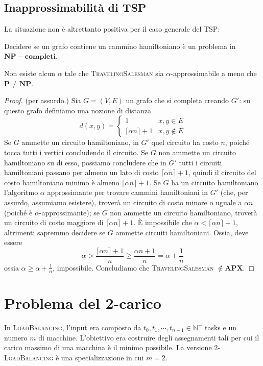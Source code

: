 \subsection{Inapprossimabilità di TSP}
La situazione non è altrettanto positiva per il caso generale del TSP:
\begin{theorem}
	Decidere se un grafo contiene un cammino hamiltoniano è un problema in $\mathbf{NP-completi}$.
\end{theorem}

\begin{theorem}
	Non esiste alcun $\alpha$ tale che \textsc{TravelingSalesman} sia $\alpha$-approssimabile a meno che
	$\mathbf{P} \neq \mathbf{NP}$.
\end{theorem}
\begin{proof}
	(per assurdo.)
	Sia $G = (V,E)$ un grafo che si completa creando $G'$: su questo grafo definiamo
	una nozione di distanza
	$$
		d(x,y) =
		\begin{cases}
			1                         & x, y \in E    \\
			\lceil \alpha n \rceil +1 & x, y \notin E
		\end{cases}
	$$
	Se $G$ ammette un circuito hamiltoniano, in $G'$ quel circuito ha costo
	$n$, poiché tocca tutti i vertici concludendo il circuito. Se $G$ non ammette
	un circuito hamiltoniano su di esso, possiamo concludere che in $G'$ tutti i
	circuiti hamiltoniani passano per almeno un lato di costo $\lceil \alpha n \rceil +1 $,
	quindi il circuito del costo hamiltoniano minimo è almeno $\lceil \alpha n \rceil + 1$.
	Se $G$ ha un circuito hamiltoniano l'algoritmo $\alpha$ approssimante per
	trovare cammini hamiltoniani in $G'$ (che, per assurdo, assumiamo esistere),
	troverà un circuito di costo minore o uguale a $\alpha n$ (poiché è $\alpha$-approssimante);
	se $G$ non ammette un circuito hamiltoniano, troverà un circuito di costo
	maggiore di $\lceil \alpha n \rceil +1$.
	\`E impossibile che $\alpha < \lceil \alpha n \rceil + 1$, altrimenti sapremmo
	decidere se $G$ ammette circuiti hamiltoniani. Ossia, deve essere
	$$
		\alpha > \frac{\lceil \alpha n \rceil + 1}{n} \geq \frac{\alpha n +1}{n} = \alpha + \frac{1}{n}
	$$
	ossia $\alpha \geq \alpha + \frac{1}{n}$, impossibile.
	Concludiamo che \textsc{TravelingSalesman} $\notin \mathbf{APX}$.
\end{proof}

\section{Problema del 2-carico}
In \textsc{LoadBalancing}, l'input era composto da  $t_0, t_1, \cdots, t_{n-1} \in \mathbb{N}^+$
tasks e un numero $m$ di macchine. L'obiettivo era costruire degli assegnamenti
tali per cui il carico massimo di una macchina è il minimo possibile. La versione
\textsc{$2$-LoadBalancing} è una specializzazione in cui $m = 2$.

